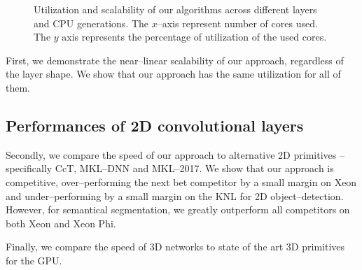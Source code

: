 \begin{figure}
\begin{tabular}{ >{\centering\arraybackslash}c ccccccl }
    \end{tabular}
    \caption{Utilization and scalability of our algorithms across
      different layers and CPU generations.  The $x$--axis represent
      number of cores used.  The $y$ axis represents the percentage of
      utilization of the used cores.}
    \label{fig:scalability}
  \end{figure}

  First, we demonstrate the near--linear scalability of our approach,
  regardless of the layer shape.  We show that our approach has the
  same utilization for all of them.

  \subsection{Performances of 2D convolutional layers}

  Secondly, we compare the speed of our approach to alternative 2D
  primitives -- specifically CcT, MKL--DNN and MKL--2017.  We show
  that our approach is competitive, over--performing the next bet
  competitor by a small margin on Xeon and under--performing by a
  small margin on the KNL for 2D object--detection.  However, for
  semantical segmentation, we greatly outperform all competitors on
  both Xeon and Xeon Phi.

  Finally, we compare the speed of 3D networks to state of the art 3D
  primitives for the GPU.

